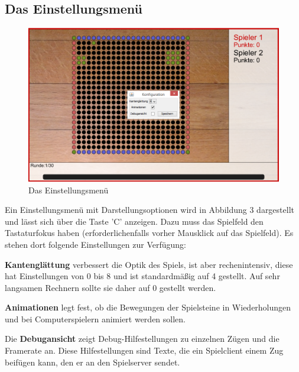 \documentclass[a4paper, ngerman]{scrartcl}
\begin{document}
\subsection{Das Einstellungsmenü}

\begin{figure}[h!]
  \centering
  \includegraphics[scale=0.6]{bilder/konfiguration.png}
  \caption{Das Einstellungsmenü}
  \label{fig:Configuration}
\end{figure}

Ein Einstellungsmenü mit Darstellungsoptionen wird in Abbildung 3
dargestellt und lässt sich über die Taste 'C' anzeigen. Dazu muss das
Spielfeld den Tastaturfokus haben (erforderlichenfalls vorher
Mausklick auf das Spielfeld). Es stehen dort folgende Einstellungen
zur Verfügung:

\textbf{Kantenglättung} verbessert die Optik des Spiels, ist aber
rechenintensiv, diese hat Einstellungen von 0 bis 8 und ist
standardmäßig auf 4 gestellt. Auf sehr langsamen Rechnern sollte sie
daher auf 0 gestellt werden.

\textbf{Animationen} legt fest, ob die Bewegungen der Spielsteine in
Wiederholungen und bei Computerspielern animiert werden sollen.

Die \textbf{Debugansicht} zeigt Debug-Hilfestellungen zu einzelnen
Zügen und die Framerate an. Diese Hilfestellungen sind Texte, die ein
Spielclient einem Zug beifügen kann, den er an den Spielserver sendet.
\end{document}
